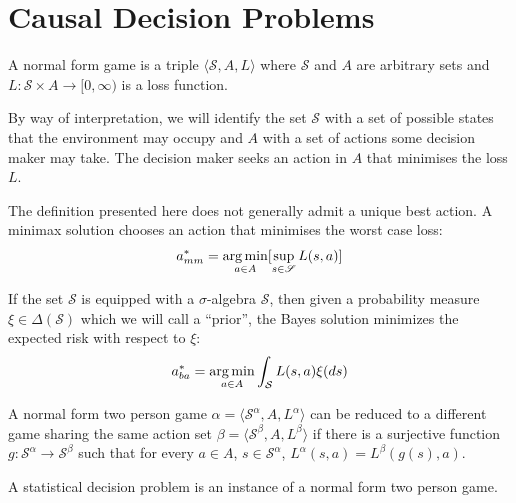 \section{Causal Decision Problems}

\begin{definition}
A normal form game is a triple $\langle \mathscr{S}, A, L\rangle$ where $\mathscr{S}$ and $A$ are arbitrary sets and $L:\mathscr{S}\times A\to [0,\infty)$ is a loss function.

By way of interpretation, we will identify the set $\mathscr{S}$ with a set of possible states that the environment may occupy and $A$ with a set of actions some decision maker may take. The decision maker seeks an action in $A$ that minimises the loss $L$.
\end{definition}

The definition presented here does not generally admit a unique best action. A minimax solution chooses an action that minimises the worst case loss:
\begin{align}
    a^*_{mm} = \operatorname*{arg\,min}_{a\in A} [\sup_{s\in \mathscr{S}} L(s,a)]\label{eq:mm_soln}
\end{align}

If the set $\mathscr{S}$ is equipped with a $\sigma$-algebra $\mathcal{S}$, then given a probability measure $\xi\in \Delta(\mathcal{S})$ which we will call a ``prior'', the Bayes solution minimizes the expected risk with respect to $\xi$:
\begin{align}
    a^*_{ba} = \operatorname*{arg\,min}_{a\in A} \int_{\mathcal{S}} L(s,a) \xi(ds) \label{eq:ba_soln}
\end{align}

\begin{definition}[Reduction]\label{def:red_sdp_cdp}
A normal form two person game $\alpha = \langle \mathscr{S}^\alpha, A, L^\alpha\rangle$ can be reduced to a different game sharing the same action set $\beta = \langle \mathscr{S}^\beta, A, L^\beta \rangle$ if there is a surjective function $g:\mathscr{S}^\alpha\to \mathscr{S}^\beta$ such that for every $a\in A$, $s\in \mathscr{S}^\alpha$, $L^\alpha(s,a) = L^\beta(g(s),a)$.
\end{definition}

A statistical decision problem is an instance of a normal form two person game.

